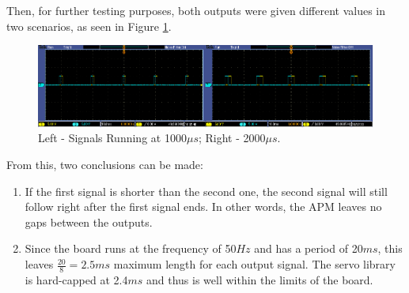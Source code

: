 Then, for further testing purposes, both outputs were given different values in two scenarios, as seen in Figure \ref{oscillo3}.

\begin{figure}[H]
  \centering
    \includegraphics[width=1\textwidth]{images/oscillo3.png}
	\caption{Left - Signals Running at 1000$\mu s$; Right - 2000$\mu s$.}
	\label{oscillo3}
\end{figure}

From this, two conclusions can be made:
\begin{enumerate}
\item If the first signal is shorter than the second one, the second signal will still follow right after the first signal ends. In other words, the APM leaves no gaps between the outputs.
\item Since the board runs at the frequency of 50$Hz$ and has a period of 20$ms$, this leaves $\frac{20}{8} = 2.5ms$ maximum length for each output signal. The servo library is hard-capped at 2.4$ms$ and thus is well within the limits of the board.
\end{enumerate}

